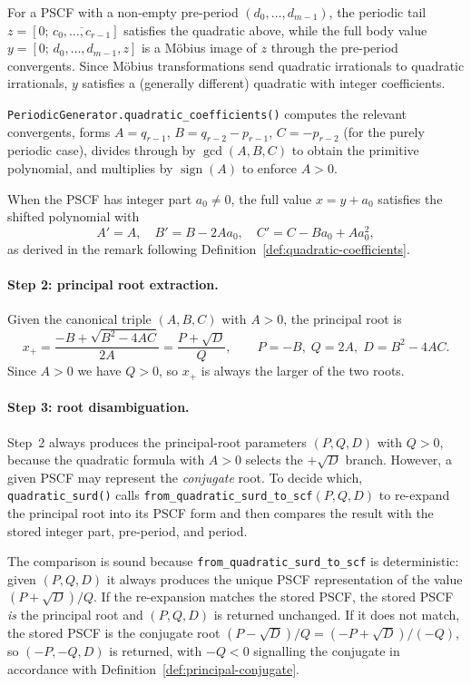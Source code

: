 For a PSCF with a non-empty pre-period $(d_0, \ldots, d_{m-1})$, the
periodic tail $z = [0;\,\overline{c_0,\ldots,c_{r-1}}]$ satisfies the
quadratic above, while the full body value
$y = [0;\,d_0,\ldots,d_{m-1},z]$ is a M\"obius image of $z$ through the
pre-period convergents.  Since M\"obius transformations send quadratic
irrationals to quadratic irrationals, $y$ satisfies a (generally different)
quadratic with integer coefficients.

\texttt{PeriodicGenerator.quadratic\_coefficients()} computes the relevant
convergents, forms $A = q_{r-1}$, $B = q_{r-2} - p_{r-1}$,
$C = -p_{r-2}$ (for the purely periodic case), divides through by
$\gcd(A, B, C)$ to obtain the primitive polynomial, and multiplies by
$\operatorname{sign}(A)$ to enforce $A > 0$.

When the PSCF has integer part $a_0 \neq 0$, the full value $x = y + a_0$
satisfies the shifted polynomial with
\[
  A' = A, \quad B' = B - 2A a_0, \quad C' = C - B a_0 + A a_0^2,
\]
as derived in the remark following Definition~\ref{def:quadratic-coefficients}.

\paragraph{Step 2: principal root extraction.}
Given the canonical triple $(A, B, C)$ with $A > 0$, the principal root is
\[
  x_+ = \frac{-B + \sqrt{B^2 - 4AC}}{2A} = \frac{P + \sqrt{D}}{Q},
  \qquad P = -B,\; Q = 2A,\; D = B^2 - 4AC.
\]
Since $A > 0$ we have $Q > 0$, so $x_+$ is always the larger of the two roots.

\paragraph{Step 3: root disambiguation.}
Step~2 always produces the principal-root parameters $(P, Q, D)$ with $Q > 0$,
because the quadratic formula with $A > 0$ selects the $+\sqrt{D}$ branch.
However, a given PSCF may represent the \emph{conjugate} root.  To decide
which, \texttt{quadratic\_surd()} calls
\texttt{from\_quadratic\_surd\_to\_scf}$(P, Q, D)$ to re-expand the principal
root into its PSCF form and then compares the result with the stored integer
part, pre-period, and period.

The comparison is sound because \texttt{from\_quadratic\_surd\_to\_scf} is
deterministic: given $(P, Q, D)$ it always produces the unique PSCF
representation of the value $(P + \sqrt{D})/Q$.  If the re-expansion matches
the stored PSCF, the stored PSCF \emph{is} the principal root and $(P, Q, D)$
is returned unchanged.  If it does not match, the stored PSCF is the conjugate
root $(P - \sqrt{D})/Q = (-P + \sqrt{D})/(-Q)$, so $(-P, -Q, D)$ is returned,
with $-Q < 0$ signalling the conjugate in accordance with
Definition~\ref{def:principal-conjugate}.

